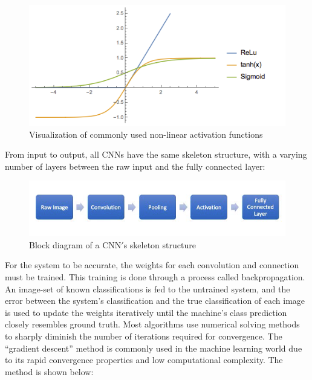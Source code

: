 \documentclass[12pt]{drexelthesis}
\begin{document}
\begin{figure}
\centering
\includegraphics[width=5in]{cnnReLu.png}
\caption[Common CNN non-linear activation functions]{Visualization of commonly used non-linear activation functions}
\end{figure}

From input to output, all CNNs have the same skeleton structure, with a varying number of layers between the raw input and the fully connected layer:

\begin{figure}
\centering
\includegraphics[width=6in]{cnn_flow.png}
\caption[Block diagram of CNN flow]{Block diagram of a CNN$'$s skeleton structure}
\end{figure}

For the system to be accurate, the weights for each convolution and connection must be trained. This training is done through a process called backpropagation. An image-set of known classifications is fed to the untrained system, and the error between the system’s classification and the true classification of each image is used to update the weights iteratively until the machine’s class prediction closely resembles ground truth. Most algorithms use numerical solving methods to sharply diminish the number of iterations required for convergence. The “gradient descent” method is commonly used in the machine learning world due to its rapid convergence properties and low computational complexity. The method is shown below:
\end{document}
